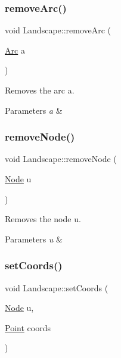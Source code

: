 \mbox{\label{class_landscape_ada96d1d07c462e043133440f647211b2}} 
\subsubsection{\texorpdfstring{remove\+Arc()}{removeArc()}}
{\footnotesize\ttfamily void Landscape\+::remove\+Arc (\begin{DoxyParamCaption}\item[{\hyperlink{classconcepts_1_1_abstract_landscape_a0966623f028fe50ac9a3ae114dcf2672}{Arc}}]{a }\end{DoxyParamCaption})}



Removes the arc a. 


\begin{DoxyParams}{Parameters}
{\em a} & \\
\hline
\end{DoxyParams}
\mbox{\label{class_landscape_a800ffffd591570d5a19a030707f51365}} 
\subsubsection{\texorpdfstring{remove\+Node()}{removeNode()}}
{\footnotesize\ttfamily void Landscape\+::remove\+Node (\begin{DoxyParamCaption}\item[{\hyperlink{classconcepts_1_1_abstract_landscape_a7c2f90fb9f42302f1af84a59f4df4b91}{Node}}]{u }\end{DoxyParamCaption})}



Removes the node u. 


\begin{DoxyParams}{Parameters}
{\em u} & \\
\hline
\end{DoxyParams}
\mbox{\label{class_landscape_a4c8df159a4754013dd381bfff23d133d}} 
\subsubsection{\texorpdfstring{set\+Coords()}{setCoords()}}
{\footnotesize\ttfamily void Landscape\+::set\+Coords (\begin{DoxyParamCaption}\item[{\hyperlink{classconcepts_1_1_abstract_landscape_a7c2f90fb9f42302f1af84a59f4df4b91}{Node}}]{u,  }\item[{\hyperlink{abstract__landscape_8hpp_a9c14bcba65b035519a9c98f1eb1babbe}{Point}}]{coords }\end{DoxyParamCaption})}



